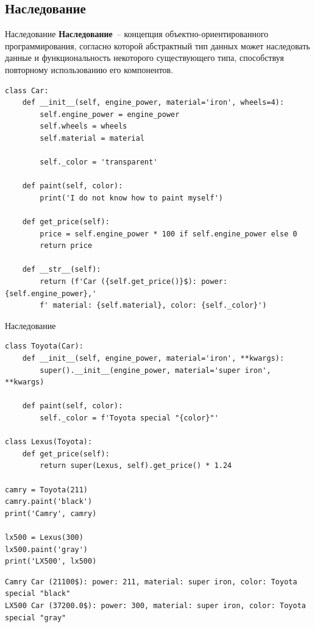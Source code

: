 \documentclass[aspectratio=169, mathserif]{beamer}	%
\begin{document}
\subsection{Наследование}
\begin{frame}[fragile]{Наследование}
\scriptsize
\textcolor{tpugreen}{\textbf{Наследование}}~-- концепция объектно-ориентированного программирования, согласно которой абстрактный тип данных может наследовать данные и функциональность некоторого существующего типа, способствуя повторному использованию его компонентов.
\vfill
\begin{verbatim}
class Car:
    def __init__(self, engine_power, material='iron', wheels=4):
        self.engine_power = engine_power
        self.wheels = wheels
        self.material = material

        self._color = 'transparent'

    def paint(self, color):
        print('I do not know how to paint myself')

    def get_price(self):
        price = self.engine_power * 100 if self.engine_power else 0
        return price

    def __str__(self):
        return (f'Car ({self.get_price()}$): power: {self.engine_power},'
        f' material: {self.material}, color: {self._color}')
\end{verbatim}
\vfill
\end{frame}


\begin{frame}[fragile]{Наследование}
\scriptsize
\begin{verbatim}
class Toyota(Car):
    def __init__(self, engine_power, material='iron', **kwargs):
        super().__init__(engine_power, material='super iron', **kwargs)

    def paint(self, color):
        self._color = f'Toyota special "{color}"'

class Lexus(Toyota):
    def get_price(self):
        return super(Lexus, self).get_price() * 1.24

camry = Toyota(211)
camry.paint('black')
print('Camry', camry)

lx500 = Lexus(300)
lx500.paint('gray')
print('LX500', lx500)
\end{verbatim}
\vfill
    \begin{Verbatim}[commandchars=\\\{\}]
Camry Car (21100$): power: 211, material: super iron, color: Toyota special "black"
LX500 Car (37200.0$): power: 300, material: super iron, color: Toyota special "gray"
    \end{Verbatim}
\vfill
\end{frame}
\end{document}
